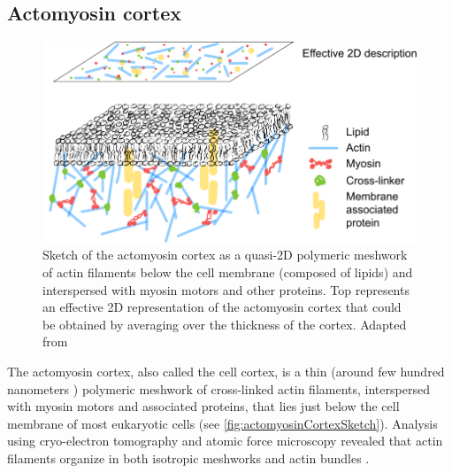 \subsection{Actomyosin cortex}\label{subsec:ActomyosinCortex}

\begin{figure}[h]
    \centering
    \includegraphics[width=\textwidth]{Introduction/FigureActomyosin/actomyosinSketch.pdf}
    \caption[Sketch of actomyosin cortex]{Sketch of the actomyosin cortex as a quasi-2D polymeric meshwork of actin filaments below the cell membrane (composed of lipids) and interspersed with myosin motors and other proteins. Top represents an effective 2D representation of the actomyosin cortex that could be obtained by averaging over the thickness of the cortex. Adapted from \cite{kumar2021actomyosin}}
    \label{fig:actomyosinCortexSketch}
\end{figure}

The actomyosin cortex, also called the cell cortex, is a thin (around few hundred nanometers \citep{clark2013monitoring}) polymeric meshwork of cross-linked actin filaments, interspersed with myosin motors and associated proteins, that lies just below the cell membrane of most eukaryotic cells \citep{bray1988cortical,chaffey2003alberts} (see \autoref{fig:actomyosinCortexSketch}). Analysis using cryo-electron tomography and atomic force microscopy revealed that actin filaments organize in both isotropic meshworks and actin bundles \citep{hartwig1991cytoskeleton,heuser1980filament,morone2006three,medalia2002macromolecular,pesen2005micromechanical}. 

